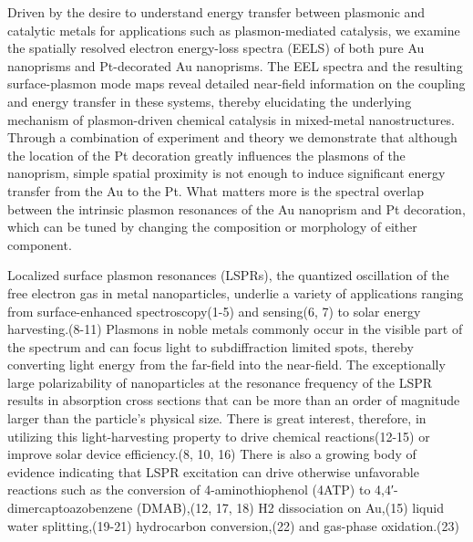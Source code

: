 \documentclass [11pt, proquest] {uwthesis}[2016/11/22]
\newenvironment{ch_abstract}
{%
\begin{center}
\begin{minipage}{\dimexpr\paperwidth-3in}
}
{%
\end{minipage}
\end{center}
}
\begin{document}
\begin{ch_abstract}
Driven by the desire to understand energy transfer between plasmonic and catalytic metals for applications such as plasmon-mediated catalysis, we examine the spatially resolved electron energy-loss spectra (EELS) of both pure Au nanoprisms and Pt-decorated Au nanoprisms. The EEL spectra and the resulting surface-plasmon mode maps reveal detailed near-field information on the coupling and energy transfer in these systems, thereby elucidating the underlying mechanism of plasmon-driven chemical catalysis in mixed-metal nanostructures. Through a combination of experiment and theory we demonstrate that although the location of the Pt decoration greatly influences the plasmons of the nanoprism, simple spatial proximity is not enough to induce significant energy transfer from the Au to the Pt. What matters more is the spectral overlap between the intrinsic plasmon resonances of the Au nanoprism and Pt decoration, which can be tuned by changing the composition or morphology of either component.
\end{ch_abstract}

Localized surface plasmon resonances (LSPRs), the quantized oscillation of the free electron gas in metal nanoparticles, underlie a variety of applications ranging from surface-enhanced spectroscopy(1-5) and sensing(6, 7) to solar energy harvesting.(8-11) Plasmons in noble metals commonly occur in the visible part of the spectrum and can focus light to subdiffraction limited spots, thereby converting light energy from the far-field into the near-field. The exceptionally large polarizability of nanoparticles at the resonance frequency of the LSPR results in absorption cross sections that can be more than an order of magnitude larger than the particle’s physical size. There is great interest, therefore, in utilizing this light-harvesting property to drive chemical reactions(12-15) or improve solar device efficiency.(8, 10, 16) There is also a growing body of evidence indicating that LSPR excitation can drive otherwise unfavorable reactions such as the conversion of 4-aminothiophenol (4ATP) to 4,4′-dimercaptoazobenzene (DMAB),(12, 17, 18) H2 dissociation on Au,(15) liquid water splitting,(19-21) hydrocarbon conversion,(22) and gas-phase oxidation.(23)
\end{document}
